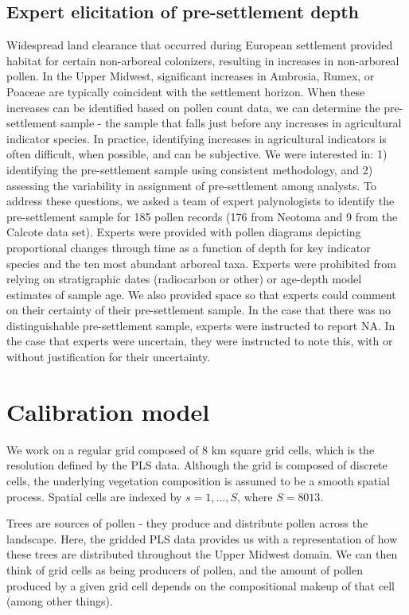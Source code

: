 \documentclass[12pt]{article}
\begin{document}
\subsection{Expert elicitation of pre-settlement depth}
Widespread land clearance that occurred during European settlement
provided habitat for certain non-arboreal colonizers, resulting in
increases in non-arboreal pollen. In the Upper Midwest, significant
increases in Ambrosia, Rumex, or Poaceae are typically coincident with
the settlement horizon. When these increases can be identified based
on pollen count data, we can determine the pre-settlement sample - the
sample that falls just before any increases in agricultural indicator
species. In practice, identifying increases in agricultural indicators
is often difficult, when possible, and can be subjective. We were
interested in: 1) identifying the pre-settlement sample using
consistent methodology, and 2) assessing the variability in assignment
of pre-settlement among analysts. To address these questions, we asked
a team of expert palynologists to identify the pre-settlement sample
for 185 pollen records (176 from Neotoma and 9 from the Calcote data
set). Experts were provided with pollen diagrams depicting
proportional changes through time as a function of depth for key
indicator species and the ten most abundant arboreal taxa. Experts
were prohibited from relying on stratigraphic dates (radiocarbon or
other) or age-depth model estimates of sample age. We also provided
space so that experts could comment on their certainty of their
pre-settlement sample. In the case that there was no distinguishable
pre-settlement sample, experts were instructed to report NA. In the
case that experts were uncertain, they were instructed to note this,
with or without justification for their uncertainty.

\section{Calibration model}

We work on a regular grid composed of 8 km square grid cells, which is
the resolution defined by the PLS data. Although the grid is composed
of discrete cells, the underlying vegetation composition is assumed to
be a smooth spatial process. Spatial cells are indexed by
$s=1,\ldots,S$, where $S=8013$.

Trees are sources of pollen - they produce and distribute pollen
across the landscape. Here, the gridded PLS data provides us with a
representation of how these trees are distributed throughout the Upper
Midwest domain. We can then think of grid cells as being producers of
pollen, and the amount of pollen produced by a given grid cell
depends on the compositional makeup of that cell (among other things). 
\end{document}
